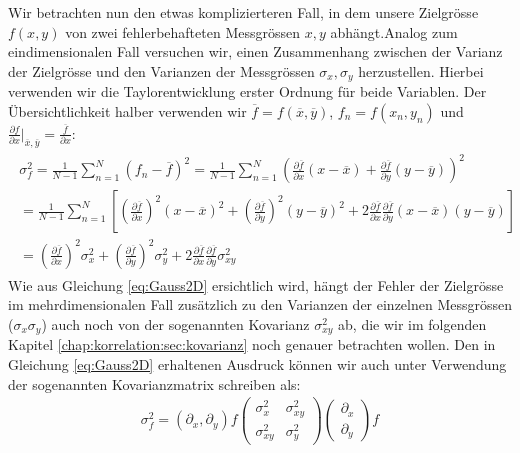 Wir betrachten nun den etwas komplizierteren Fall, in dem unsere Zielgrösse $f(x,y)$ von zwei fehlerbehafteten Messgrössen $x, y$ abhängt.Analog zum eindimensionalen Fall versuchen wir, einen Zusammenhang zwischen der Varianz der Zielgrösse und den Varianzen der Messgrössen $\sigma_x, \sigma_y$ herzustellen. Hierbei verwenden wir die Taylorentwicklung erster Ordnung für beide Variablen. Der Übersichtlichkeit halber verwenden wir $\overline{f} = f(\overline{x}, \overline{y})$, $f_n = f(x_n, y_n)$ und $\frac{\partial f}{\partial x}\bigg|_{\overline{x}, \overline{y}} = \frac{\overline{f}}{\partial x}$:
\begin{align}
\begin{split}
\sigma_f^2 = \frac{1}{N-1} \sum_{n=1}^N (f_n - \overline{f})^2 = \frac{1}{N-1}\sum_{n=1}^N \left( \frac{\partial \overline{f}}{\partial x} (x - \overline{x}) + \frac{\partial \overline{f}}{\partial y} (y - \overline{y})\right)^2  \\
=  \frac{1}{N-1}\sum_{n=1}^N \left[ \left(\frac{\partial \overline{f}}{\partial x}\right)^2 (x - \overline{x})^2 + \left(\frac{\partial \overline{f}}{\partial y}\right)^2 (y - \overline{y})^2 + 2\frac{\partial \overline{f}}{\partial x}\frac{\partial \overline{f}}{\partial y}(x - \overline{x})(y - \overline{y})\right] \\
= \left(\frac{\partial \overline{f}}{\partial x}\right)^2\sigma_x^2 +  \left(\frac{\partial \overline{f}}{\partial y}\right)^2\sigma_y^2 + 2\frac{\partial \overline{f}}{\partial x}\frac{\partial \overline{f}}{\partial y}\sigma_{xy}^2
\end{split}
\label{eq:Gauss2D}
\end{align}
Wie aus Gleichung \ref{eq:Gauss2D} ersichtlich wird, hängt der Fehler der Zielgrösse im mehrdimensionalen Fall zusätzlich zu den Varianzen der einzelnen Messgrössen ($\sigma_x\sigma_y$) auch noch von der sogenannten Kovarianz $\sigma_{xy}^2$ ab, die wir im folgenden Kapitel \ref{chap:korrelation:sec:kovarianz} noch genauer betrachten wollen. Den in Gleichung \ref{eq:Gauss2D} erhaltenen Ausdruck können wir auch unter Verwendung der sogenannten Kovarianzmatrix schreiben als:
\begin{align}
\sigma_f^2 = (\partial_x, \partial_y)f \begin{pmatrix}
\sigma_x^2 & \sigma_{xy}^2 \\
\sigma_{xy}^2 & \sigma_y^2 
\end{pmatrix} \begin{pmatrix}
\partial_x \\
\partial_y 
\end{pmatrix} f
\end{align}
